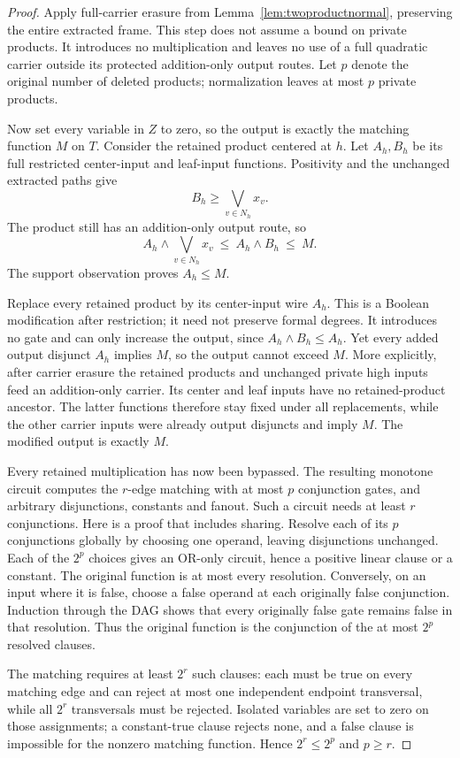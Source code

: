 \documentclass[11pt]{article}
\theoremstyle{definition}
\theoremstyle{remark}
\begin{document}
\begin{proof}
Apply full-carrier erasure from Lemma~\ref{lem:twoproductnormal}, preserving the entire extracted frame. This step does not assume a bound on private products. It introduces no multiplication and leaves no use of a full quadratic carrier outside its protected addition-only output routes. Let $p$ denote the original number of deleted products; normalization leaves at most $p$ private products.

Now set every variable in $Z$ to zero, so the output is exactly the matching function $M$ on $T$. Consider the retained product centered at $h$. Let $A_h,B_h$ be its full restricted center-input and leaf-input functions. Positivity and the unchanged extracted paths give
\[
 B_h\ge\bigvee_{v\in N_h}x_v.
\]
The product still has an addition-only output route, so
\[
 A_h\wedge\bigvee_{v\in N_h}x_v
 \ \le\ A_h\wedge B_h\ \le\ M.
\]
The support observation proves $A_h\le M$.

Replace every retained product by its center-input wire $A_h$. This is a Boolean modification after restriction; it need not preserve formal degrees. It introduces no gate and can only increase the output, since $A_h\wedge B_h\le A_h$. Yet every added output disjunct $A_h$ implies $M$, so the output cannot exceed $M$. More explicitly, after carrier erasure the retained products and unchanged private high inputs feed an addition-only carrier. Its center and leaf inputs have no retained-product ancestor. The latter functions therefore stay fixed under all replacements, while the other carrier inputs were already output disjuncts and imply $M$. The modified output is exactly $M$.

Every retained multiplication has now been bypassed. The resulting monotone circuit computes the $r$-edge matching with at most $p$ conjunction gates, and arbitrary disjunctions, constants and fanout. Such a circuit needs at least $r$ conjunctions. Here is a proof that includes sharing. Resolve each of its $p$ conjunctions globally by choosing one operand, leaving disjunctions unchanged. Each of the $2^p$ choices gives an OR-only circuit, hence a positive linear clause or a constant. The original function is at most every resolution. Conversely, on an input where it is false, choose a false operand at each originally false conjunction. Induction through the DAG shows that every originally false gate remains false in that resolution. Thus the original function is the conjunction of the at most $2^p$ resolved clauses.

The matching requires at least $2^r$ such clauses: each must be true on every matching edge and can reject at most one independent endpoint transversal, while all $2^r$ transversals must be rejected. Isolated variables are set to zero on those assignments; a constant-true clause rejects none, and a false clause is impossible for the nonzero matching function. Hence $2^r\le2^p$ and $p\ge r$.
\end{proof}
\end{document}
